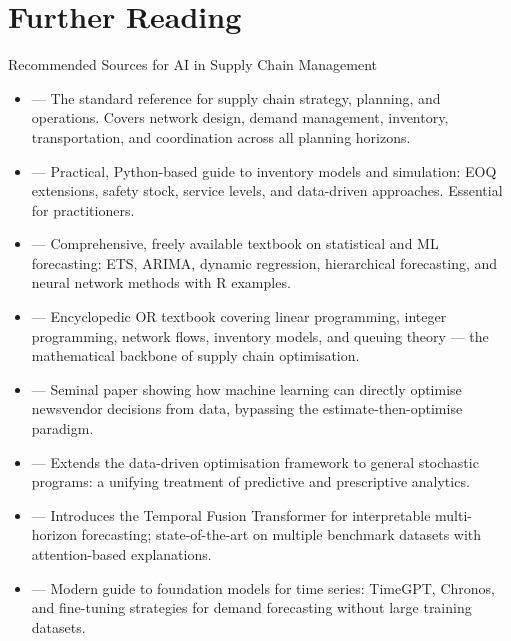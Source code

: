 
\section{Further Reading}

\begin{v3topic}{Recommended Sources for AI in Supply Chain Management}
    \begin{itemize}
        \item {} --- The standard reference for supply chain strategy, planning, and operations. Covers network design, demand management, inventory, transportation, and coordination across all planning horizons.
        \item {} --- Practical, Python-based guide to inventory models and simulation: EOQ extensions, safety stock, service levels, and data-driven approaches. Essential for practitioners.
        \item {} --- Comprehensive, freely available textbook on statistical and ML forecasting: ETS, ARIMA, dynamic regression, hierarchical forecasting, and neural network methods with R examples.
        \item {} --- Encyclopedic OR textbook covering linear programming, integer programming, network flows, inventory models, and queuing theory --- the mathematical backbone of supply chain optimisation.
        \item {} --- Seminal paper showing how machine learning can directly optimise newsvendor decisions from data, bypassing the estimate-then-optimise paradigm.
        \item {} --- Extends the data-driven optimisation framework to general stochastic programs: a unifying treatment of predictive and prescriptive analytics.
        \item {} --- Introduces the Temporal Fusion Transformer for interpretable multi-horizon forecasting; state-of-the-art on multiple benchmark datasets with attention-based explanations.
        \item {} --- Modern guide to foundation models for time series: TimeGPT, Chronos, and fine-tuning strategies for demand forecasting without large training datasets.
    \end{itemize}
\end{v3topic}
